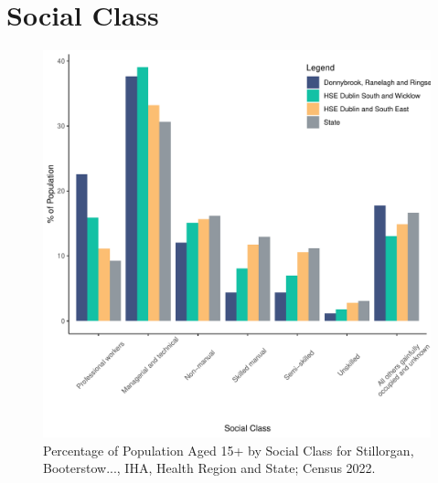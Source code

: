 \documentclass{article}
\begin{document}
\section{Social Class}\label{sect:SC}
\begin{figure}[H]
	\centering
	\includegraphics[width = 140mm]{../figures/SocialClassED.pdf}
	\caption{Percentage of Population Aged 15+ by Social Class for Stillorgan, Booterstow..., IHA, Health Region and State; Census 2022.}
	\label{fig:vbnv}
	\end{figure}
\end{document}
